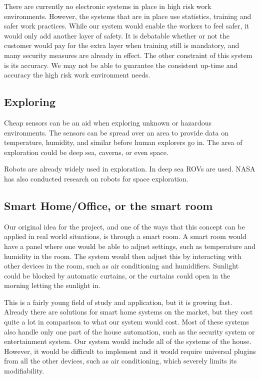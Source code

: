\documentclass[../document]{subfiles}
\begin{document}
There are currently no electronic systems in place in high risk work environments. However, the systems that are in place use statistics, training and safer work practices. While our system would enable the workers to feel safer, it would only add another layer of safety. It is debatable whether or not the customer would pay for the extra layer when training still is mandatory, and many security measures are already in effect. The other constraint of this system is its accuracy. We may not be able to guarantee the consistent up-time and accuracy the high risk work environment needs.

\subsection{Exploring}
Cheap sensors can be an aid when exploring unknown or hazardous environments. The sensors can be spread over an area to provide data on temperature, humidity, and similar before human explorers go in. The area of exploration could be deep sea, caverns, or even space.

Robots are already widely used in exploration. In deep sea ROVs are used. NASA has also conducted research on robots for space exploration.

\subsection{Smart Home/Office, or the smart room}
Our original idea for the project, and one of the ways that this concept can be applied in real world situations, is through a smart room. A smart room would have a panel where one would be able to adjust settings, such as temperature and humidity in the room. The system would then adjust this by interacting with other devices in the room, such as air conditioning and humidifiers. Sunlight could be blocked by automatic curtains, or the curtains could open in the morning letting the sunlight in.

This is a fairly young field of study and application, but it is growing fast. Already there are solutions for smart home systems on the market, but they cost quite a lot in comparison to what our system would cost. Most of these systems also handle only one part of the house automation, such as the security system or entertainment system. Our system would include all of the systems of the house. However, it would be difficult to implement and it would require universal plugins from all the other devices, such as air conditioning, which severely limits its modifiability.
\end{document}
